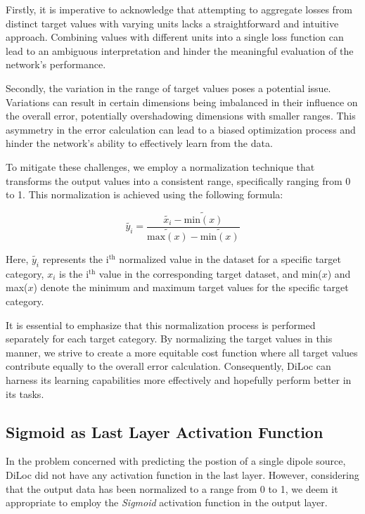 \documentclass[a4paper, UKenglish, 11pt]{uiomaster}
\begin{document}
Firstly, it is imperative to acknowledge that attempting to aggregate  losses from distinct target values with varying units lacks a straightforward and intuitive approach. Combining values with different units into a single loss function can lead to an ambiguous interpretation and hinder the meaningful evaluation of the network's performance.

Secondly, the variation in the range of target values poses a potential issue. Variations can result in certain dimensions being imbalanced in their influence on the overall error, potentially overshadowing dimensions with smaller ranges. This asymmetry in the error calculation can lead to a biased optimization process and hinder the network's ability to effectively learn from the data.

To mitigate these challenges, we employ a normalization technique that transforms the output values into a consistent range, specifically ranging from 0 to 1. This normalization is achieved using the following formula:

\begin{equation}
\tilde{y_i} = \frac{\tilde{x_i} - \tilde{\text{min}(x)}}{\tilde{\text{max}(x)} - \tilde{\text{min}(x)}}
\label{eq:scale_target}
\end{equation}

Here, $\tilde{y_i}$ represents the i$^{\text{th}}$ normalized value in the dataset for a specific target category, $x_i$ is the i$^{\text{th}}$ value in the corresponding target dataset, and min($x$) and max($x$) denote the minimum and maximum target values for the specific target category.

It is essential to emphasize that this normalization process is performed separately for each target category. By normalizing the target values in this manner, we strive to create a more equitable cost function where all target values contribute equally to the overall error calculation. Consequently, DiLoc can harness its learning capabilities more effectively and hopefully perform better in its tasks.



\subsection{Sigmoid as Last Layer Activation Function}
In the problem concerned with predicting the postion of a single dipole source, DiLoc did not have any activation function in the last layer.
However, considering that the output data has been normalized to a range from 0 to 1, we deem it appropriate to employ the \emph{Sigmoid} activation function in the output layer.
\end{document}
